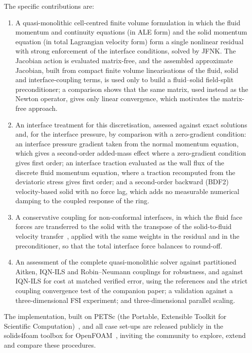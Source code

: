 The specific contributions are:
\begin{enumerate}
    \item A quasi-monolithic cell-centred finite volume formulation in which the fluid momentum and continuity equations (in ALE form) and the solid momentum equation (in total Lagrangian velocity form) form a single nonlinear residual with strong enforcement of the interface conditions, solved by JFNK.
    The Jacobian action is evaluated matrix-free, and the assembled approximate Jacobian, built from compact finite volume linearisations of the fluid, solid and interface-coupling terms, is used only to build a fluid--solid field-split preconditioner; a comparison shows that the same matrix, used instead as the Newton operator, gives only linear convergence, which motivates the matrix-free approach.
    \item An interface treatment for this discretisation, assessed against exact solutions and, for the interface pressure, by comparison with a zero-gradient condition: an interface pressure gradient taken from the normal momentum equation, which gives a second-order added-mass effect where a zero-gradient condition gives first order; an interface traction evaluated as the wall flux of the discrete fluid momentum equation, where a traction recomputed from the deviatoric stress gives first order; and a second-order backward (BDF2) velocity-based solid with no force lag, which adds no measurable numerical damping to the coupled response of the ring.
    \item A conservative coupling for non-conformal interfaces, in which the fluid face forces are transferred to the solid with the transpose of the solid-to-fluid velocity transfer~\citep{Farhat1998}, applied with the same weights in the residual and in the preconditioner, so that the total interface force balances to round-off.
    \item An assessment of the complete quasi-monolithic solver against partitioned Aitken, IQN-ILS and Robin--Neumann couplings for robustness, and against IQN-ILS for cost at matched verified error, using the references and the strict coupling convergence test of the companion paper; a validation against a three-dimensional FSI experiment; and three-dimensional parallel scaling.
\end{enumerate}
The implementation, built on PETSc (the Portable, Extensible Toolkit for Scientific Computation)~\citep{PETSc}, and all case set-ups are released publicly in the solids4foam toolbox for OpenFOAM~\citep{Cardiff2025}, inviting the community to explore, extend and compare these procedures.

